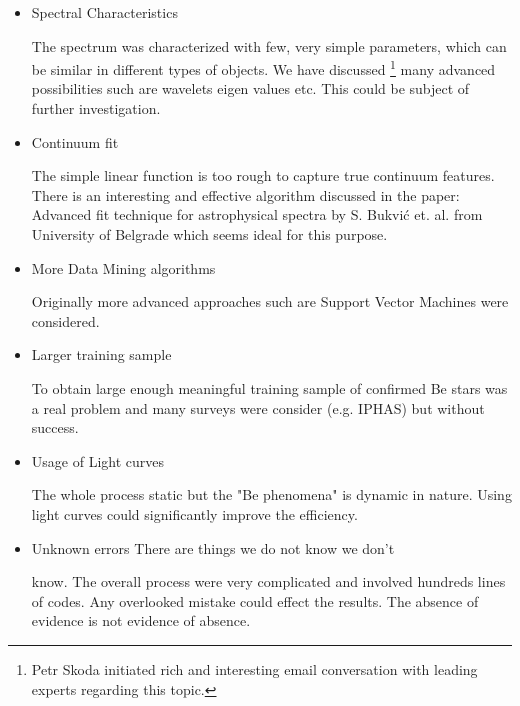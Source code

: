 \begin{itemize}
\item Spectral Characteristics 

  The spectrum was characterized with few, very simple parameters,
  which can be similar in different types of objects. We have
  discussed \footnote{Petr Skoda initiated rich and interesting email
    conversation with leading experts regarding this topic.} many
  advanced possibilities such are wavelets eigen values etc. This
  could be subject of further investigation.
\item Continuum fit

  The simple linear function is too rough to capture true continuum
  features. There is an interesting and effective algorithm discussed
  in the paper: Advanced fit technique for astrophysical spectra by
  S. Bukvi{\'c} et. al. from University of Belgrade
  \cite{bukvic2008advanced} which seems ideal for this purpose.

\item More Data Mining algorithms

Originally more advanced approaches such are Support Vector Machines
were considered.
\item Larger training sample

  To obtain large enough meaningful training sample of confirmed Be
  stars was a real problem and  many surveys were consider
  (e.g. IPHAS)  but without success.

\item Usage of Light curves 

  The whole process static but the "Be phenomena" is dynamic in
  nature. Using light curves could significantly improve the
  efficiency.
\item Unknown errors There are things we do not know we don't

  know. The overall process were very complicated and involved
  hundreds lines of codes. Any overlooked mistake could effect the
  results. The absence of evidence is not evidence of absence.
\end{itemize}



